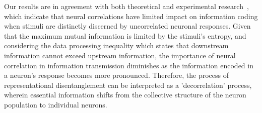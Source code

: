 Our results are in agreement with both theoretical and experimental research~\cite{Schneidman2003, Averbeck2006, Golledge2003, montani2007role, Kriegeskorte2021}, which indicate that neural correlations have limited impact on information coding when stimuli are distinctly discerned by uncorrelated neuronal responses. 
Given that the maximum mutual information is limited by the stimuli's entropy, and considering the data processing inequality which states that downstream information cannot exceed upstream information, the importance of neural correlation in information transmission diminishes as the information encoded in a neuron's response becomes more pronounced. 
Therefore, the process of representational disentanglement can be interpreted as a 'decorrelation' process, wherein essential information shifts from the collective structure of the neuron population to individual neurons.